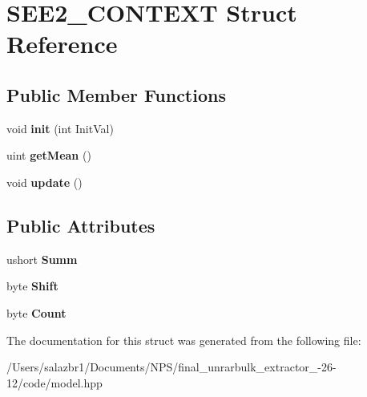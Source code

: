 \hypertarget{struct_s_e_e2___c_o_n_t_e_x_t}{\section{S\-E\-E2\-\_\-\-C\-O\-N\-T\-E\-X\-T Struct Reference}
\label{struct_s_e_e2___c_o_n_t_e_x_t}
}
\subsection*{Public Member Functions}
\begin{DoxyCompactItemize}
\item 
\hypertarget{struct_s_e_e2___c_o_n_t_e_x_t_a5b7bb820df74d704561d273e276806a5}{void {\bfseries init} (int Init\-Val)}\label{struct_s_e_e2___c_o_n_t_e_x_t_a5b7bb820df74d704561d273e276806a5}

\item 
\hypertarget{struct_s_e_e2___c_o_n_t_e_x_t_a08f1452051c43e0740a41edae8e51998}{uint {\bfseries get\-Mean} ()}\label{struct_s_e_e2___c_o_n_t_e_x_t_a08f1452051c43e0740a41edae8e51998}

\item 
\hypertarget{struct_s_e_e2___c_o_n_t_e_x_t_a0190ef0a3c0e25b8c019cebcebf58375}{void {\bfseries update} ()}\label{struct_s_e_e2___c_o_n_t_e_x_t_a0190ef0a3c0e25b8c019cebcebf58375}

\end{DoxyCompactItemize}
\subsection*{Public Attributes}
\begin{DoxyCompactItemize}
\item 
\hypertarget{struct_s_e_e2___c_o_n_t_e_x_t_acc45d22694075ab3f1384c0277b49736}{ushort {\bfseries Summ}}\label{struct_s_e_e2___c_o_n_t_e_x_t_acc45d22694075ab3f1384c0277b49736}

\item 
\hypertarget{struct_s_e_e2___c_o_n_t_e_x_t_a6019238c57a030a8b1c5de1f6b8e4e5a}{byte {\bfseries Shift}}\label{struct_s_e_e2___c_o_n_t_e_x_t_a6019238c57a030a8b1c5de1f6b8e4e5a}

\item 
\hypertarget{struct_s_e_e2___c_o_n_t_e_x_t_aea117818653f77fd5a7d9c66eec202d4}{byte {\bfseries Count}}\label{struct_s_e_e2___c_o_n_t_e_x_t_aea117818653f77fd5a7d9c66eec202d4}

\end{DoxyCompactItemize}


The documentation for this struct was generated from the following file\-:\begin{DoxyCompactItemize}
\item 
/\-Users/salazbr1/\-Documents/\-N\-P\-S/final\-\_\-unrarbulk\-\_\-extractor\-\_-\/26-\/12/code/model.\-hpp\end{DoxyCompactItemize}
